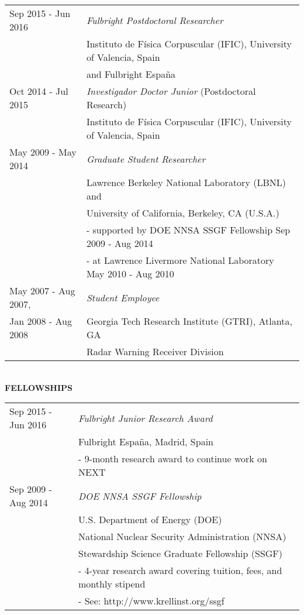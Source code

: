 \begin{tabular}{ll}
	Sep 2015 - Jun 2016 & \emph{Fulbright Postdoctoral Researcher}\\
	& Instituto de F\'{i}sica Corpuscular (IFIC), University of Valencia, Spain\\
	& and Fulbright Espa\~{n}a\\

	Oct 2014 - Jul 2015 & \emph{Investigador Doctor Junior} (Postdoctoral Research)\\
	& Instituto de F\'{i}sica Corpuscular (IFIC), University of Valencia, Spain\\
	
	May 2009 - May 2014 & \emph{Graduate Student Researcher}\\
	& Lawrence Berkeley National Laboratory (LBNL) and\\
	& University of California, Berkeley, CA (U.S.A.)\\
	& - supported by DOE NNSA SSGF Fellowship Sep 2009 - Aug 2014\\
	& - at Lawrence Livermore National Laboratory May 2010 - Aug 2010\\
	
	May 2007 - Aug 2007, & \emph{Student Employee}\\
	Jan 2008 - Aug 2008 & Georgia Tech Research Institute (GTRI), Atlanta, GA\\
	& Radar Warning Receiver Division\\
\end{tabular}\\

{\noindent\textbf{FELLOWSHIPS}}\\

\begin{tabular}{ll}
	Sep 2015 - Jun 2016 & \emph{Fulbright Junior Research Award}\\
	& Fulbright Espa\~{n}a, Madrid, Spain\\
	& - 9-month research award to continue work on NEXT\\
	
	Sep 2009 - Aug 2014 & \emph{DOE NNSA SSGF Fellowship}\\
	& U.S. Department of Energy (DOE)\\
	& National Nuclear Security Administration (NNSA)\\
	& Stewardship Science Graduate Fellowship (SSGF)\\
	& - 4-year research award covering tuition, fees, and monthly stipend\\
	& - See: http://www.krellinst.org/ssgf\\
	
\end{tabular}\\

